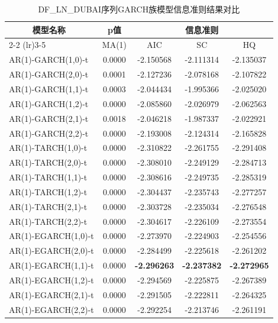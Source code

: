 \documentclass[12pt,a4paper]{ctexart}
\begin{document}
\begin{table}[H]
\centering
\caption{DF\_LN\_DUBAI序列GARCH族模型信息准则结果对比}
\label{tab:dubai_garch_criteria}
\setlength{\tabcolsep}{4pt}  %
\begin{tabular}{lcccc}
\toprule[1.2pt]
\multirow{2}{*}{$\quad\quad\,\,\,\,\,$模型名称} & \multicolumn{1}{c}{p值} & \multicolumn{3}{c}{信息准则} \\
\cmidrule(lr){2-2} \cmidrule(lr){3-5}
& MA(1) & AIC & SC & HQ \\
\midrule[0.75pt]
AR(1)-GARCH(1,0)-t     & 0.0000 & -2.150568 & -2.111314 & -2.135037 \\
AR(1)-GARCH(2,0)-t     & 0.0001 & -2.127236 & -2.078168 & -2.107822 \\
AR(1)-GARCH(1,1)-t     & 0.0003 & -2.044434 & -1.995366 & -2.025020 \\
AR(1)-GARCH(1,2)-t     & 0.0000 & -2.085860 & -2.026979 & -2.062563 \\
AR(1)-GARCH(2,1)-t     & 0.0018 & -2.046218 & -1.987337 & -2.022921 \\
AR(1)-GARCH(2,2)-t     & 0.0000 & -2.193008 & -2.124314 & -2.165828 \\
\midrule
AR(1)-TARCH(1,0)-t     & 0.0000 & -2.310822 & -2.261755 & -2.291408 \\
AR(1)-TARCH(2,0)-t     & 0.0000 & -2.308010 & -2.249129 & -2.284713 \\
AR(1)-TARCH(1,1)-t     & 0.0000 & -2.308616 & -2.249735 & -2.285319 \\
AR(1)-TARCH(1,2)-t     & 0.0000 & -2.304437 & -2.235743 & -2.277257 \\
AR(1)-TARCH(2,1)-t     & 0.0000 & -2.303728 & -2.235034 & -2.276548 \\
AR(1)-TARCH(2,2)-t     & 0.0000 & -2.304617 & -2.226109 & -2.273554 \\
\midrule
AR(1)-EGARCH(1,0)-t    & 0.0000 & -2.273970 & -2.224903 & -2.254556 \\
AR(1)-EGARCH(2,0)-t    & 0.0000 & -2.284499 & -2.225618 & -2.261202 \\
AR(1)-EGARCH(1,1)-t    & 0.0000 & \textbf{-2.296263} & \textbf{-2.237382} & \textbf{-2.272965} \\
AR(1)-EGARCH(1,2)-t    & 0.0000 & -2.294569 & -2.225875 & -2.267389 \\
AR(1)-EGARCH(2,1)-t    & 0.0000 & -2.291505 & -2.222811 & -2.264325 \\
AR(1)-EGARCH(2,2)-t    & 0.0000 & -2.292254 & -2.213746 & -2.261191 \\
\bottomrule[1.2pt]
\end{tabular}
\end{table}
\end{document}
